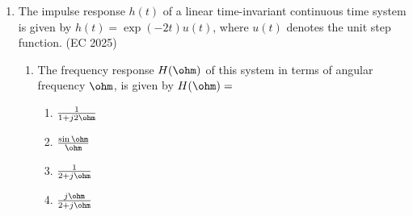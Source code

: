 \begin{enumerate}
\begin{enumerate}
\item The samples $x(n)$ ($n=0,1,2,\ldots$) are given by
 
\hfill (EC 2025)
\begin{multicols}{4}
\begin{enumerate}
  \item $5 \left( 1 - e^{-0.05 n} \right)$
  \item $5 e^{-0.05 n}$
  \item $5 \left( 1 - e^{-5 n} \right)$
  \item $5 e^{-5 n}$
\end{enumerate}
\end{multicols}

\item The expression and the region of convergence of the $z$-transform of the sampled signal are
 
\hfill (EC 2025)
\begin{multicols}{2}
\begin{enumerate}
  \item $\frac{5z}{z-e^{5}};~ |z|<e^{5}$
  \item $\frac{5z}{z-e^{-0.05}};~ |z|<e^{-0.05}$
  \item $\frac{5z}{z-e^{-0.05}};~ |z|>e^{-0.05}$
  \item $\frac{5z}{z-e^{5}};~ |z|>e^{5}$
\end{enumerate}
\end{multicols}

\end{enumerate}

\item The impulse response $h(t)$ of a linear time-invariant continuous time system is given by
$h(t) = \exp(-2 t) u(t)$, where $u(t)$ denotes the unit step function.
\hfill (EC 2025)
\begin{enumerate}

\item The frequency response $H(\ohm)$ of this system in terms of angular frequency $\ohm$, is given by $H(\ohm) = $
 
\begin{multicols}{4}
\begin{enumerate}
  \item $\frac{1}{1 + j2\ohm}$
  \item $\frac{\sin \ohm}{\ohm}$
  \item $\frac{1}{2 + j\ohm}$
  \item $\frac{j\ohm}{2 + j\ohm}$
\end{enumerate}
\end{multicols}


\end{enumerate}
\end{enumerate}
